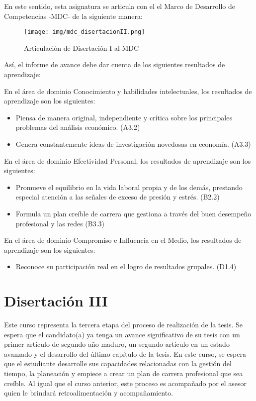 En este sentido, esta asignatura se articula con el el Marco de Desarrollo de Competencias -MDC- de la siguiente manera:

\begin{figure}[H]
\caption{Articulación de Disertación I al MDC \label{hito1_mdc} }
\begin{center}
\texttt{[image: img/mdc\_disertacionII.png]}
\end{center}
\end{figure}

Así, el informe de avance debe dar cuenta de los siguientes resultados de aprendizaje:

En el área de dominio Conocimiento y habilidades intelectuales, los resultados de aprendizaje son los siguientes:
\begin{itemize}
\item	Piensa de manera original, independiente y crítica sobre los principales problemas del análisis económico. (A3.2)
\item	Genera constantemente ideas de investigación novedosas en economía. (A3.3)
\end{itemize}
En el área de dominio Efectividad Personal, los resultados de aprendizaje son los siguientes:
\begin{itemize}
\item	Promueve el equilibrio en la vida laboral propia y de los demás, prestando especial atención a las señales de exceso de presión y estrés. (B2.2)
\item	Formula un plan creíble de carrera que gestiona a través del buen desempeño profesional y las redes (B3.3)
\end{itemize}
En el área de dominio Compromiso e Influencia en el Medio, los resultados de aprendizaje son los siguientes:
\begin{itemize}
\item	Reconoce su participación real en el logro de resultados grupales. (D1.4)
\end{itemize}

\section{Disertación III}

Este curso representa la tercera etapa del proceso de realización de la tesis. Se espera que el candidato(a) ya tenga un avance significativo de su tesis con un primer artículo de segundo año maduro, un segundo artículo en un estado avanzado y el desarrollo del último capítulo de la tesis. En este curso, se espera que el estudiante desarrolle sus capacidades relacionadas con la gestión del tiempo, la planeación y empiece a crear un plan de carrera profesional que sea creíble. Al igual que el curso anterior, este proceso es acompañado por el asesor quien le brindará retroalimentación y acompañamiento.


